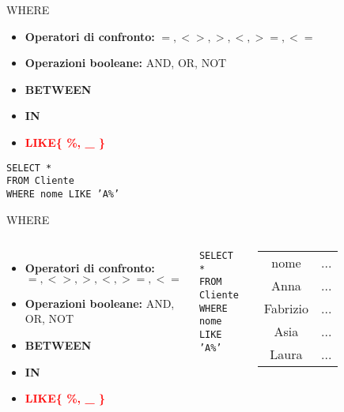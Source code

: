     \begin{frame}{WHERE}
    \begin{itemize}
        \item \textbf{Operatori di confronto:} $=, <>, >, <, >=, <=$
        \item \textbf{Operazioni booleane:} AND, OR, NOT
        \item \textbf{BETWEEN}
        \item \textbf{IN}
        \item \textbf{\textcolor{red}{LIKE\{ \%, \_ \}}}
    \end{itemize}
    \vspace{2em}
    \texttt{SELECT * \\FROM Cliente\\WHERE nome LIKE 'A\%'}
    \end{frame}
    \begin{frame}{WHERE}
    \begin{columns}[T,onlytextwidth]
    \begin{itemize}
        \item \textbf{Operatori di confronto:} $=, <>, >, <, >=, <=$
        \item \textbf{Operazioni booleane:} AND, OR, NOT
        \item \textbf{BETWEEN}
        \item \textbf{IN}
        \item \textbf{\textcolor{red}{LIKE\{ \%, \_ \}}}
    \end{itemize}
    \vspace{2em}
    \texttt{SELECT * \\FROM Cliente\\WHERE nome LIKE 'A\%'}
    \centering
    \begin{table}[h]
    \centering
    \begin{tabular}{|c|c|}
    \hline
    \rowcolor{cyan!30}\multicolumn{2}{|c|}{Cliente} \\
    \hline
    \rowcolor{cyan!30}nome &  ...  \\
    \hline
    Anna &  ... \\
    Fabrizio &  ...  \\
    Asia &  ...  \\
    Laura &  ...  \\
    \hline
    \end{tabular}
    \end{table}
    \end{columns}
    \end{frame}
